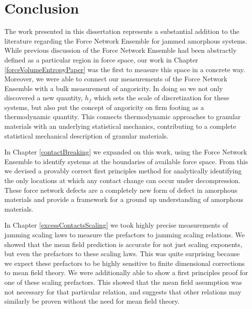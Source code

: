 \chapter{Conclusion}


The work presented in this dissertation represents a substantial addition to the literature regarding the Force Network Ensemble for jammed amorphous systems. While previous discussion of the Force Network Ensemble had been abstractly defined as a particular region in force space, our work in Chapter \ref{forceVolumeEntropyPaper} was the first to measure this space in a concrete way. Moreover, we were able to connect our measurements of the Force Network Ensemble with a bulk measurement of angoricity. In doing so we not only discovered a new quantity, $h_f$ which sets the scale of discretization for these systems, but also put the concept of angoricity on firm footing as a thermodynamic quantity. This connects thermodynamic approaches to granular materials with an underlying statistical mechanics, contributing to a complete statistical mechanical description of granular materials.

In Chapter \ref{contactBreaking} we expanded on this work, using the Force Network Ensemble to identify systems at the boundaries of available force space. From this we devised a provably correct first principles method for analytically identifying the only locations at which any contact change can occur under decompression. These force network defects are a completely new form of defect in amorphous materials and provide a framework for a ground up understanding of amorphous materials.

In Chapter \ref{excessContactsScaling} we took highly precise measurements of jamming scaling laws to measure the prefactors to jamming scaling relations. We showed that the mean field prediction is accurate for not just scaling exponents, but even the prefactors to these scaling laws. This was quite surprising because we expect these prefactors to be highly sensitive to finite dimensional corrections to mean field theory. We were additionally able to show a first principles proof for one of these scaling prefactors. This showed that the mean field assumption was not necessary for that particular relation, and suggests that other relations may similarly be proven without the need for mean field theory.
